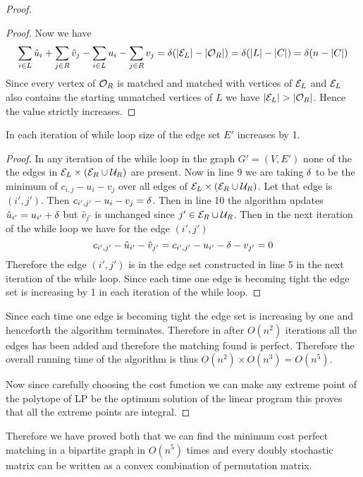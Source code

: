 \documentclass[twoside]{article}
\begin{document}
\begin{proof}
\begin{claimwidth}
\begin{proof}
			Now we have $$
			\sum\limits_{i\in L}\hat{u}_i+\sum\limits_{j\in R}\hat{v}_j-\sum\limits_{i\in L}u_i-\sum\limits_{j\in R}v_j=\delta(|\mathcal{E}_L|-|\mathcal{O}_R|)=\delta(|L|-|C|)=\delta(n-|C|)$$
			Since every vertex of $\mathcal{O}_R$ is matched and matched with vertices of $\mathcal{E}_L$ and $\mathcal{E}_L$ also contains the starting unmatched vertices of $L$ we have $|\mcE_L|>|\mcO_R|$. Hence the value strictly increases.
		\end{proof}
		\begin{claim}{}{}
			In each iteration of while loop size of the edge set $E'$ increases by 1.
		\end{claim}
		\begin{proof}
			In any iteration of the while loop in the graph $G'=(V,E')$ none of the the edges in $\mathcal{E}_L\times (\mathcal{E}_R\cup \mathcal{U}_R)$ are present. Now in line 9 we are taking $\delta$ to be the minimum of $c_{i,j}-u_i-v_j$ over all edges of $\mathcal{E}_L\times (\mathcal{E}_R\cup \mathcal{U}_R)$. Let that edge is $(i',j')$. Then $c_{i',j'}-u_i-v_j=\delta$. Then in line 10 the algorithm updates $\hat{u}_{i'}=u_{i'}+\delta$ but $\hat{v}_{j'}$ is unchanged since $j'\in \mathcal{E}_R\cup\mathcal{U}_R$. Then in the next iteration of the while loop we have for the edge $(i',j')$ $$c_{i',j'}-\hat{u}_{i'}-\hat{v}_{j'}=c_{i',j'}-u_{i'}-\delta-v_{j'}=0$$Therefore the edge $(i',j')$ is in the edge set constructed in line 5 in the next iteration of the while loop. Since each time one edge is becoming tight the edge set is increasing by 1 in each iteration of the while loop.
		\end{proof}
	\end{claimwidth}
	Since each time one edge is becoming tight the edge set is increasing by one and henceforth the algorithm terminates. Therefore in after $O(n^2)$  iterations all the edges has been added and therefore the  matching found is perfect. Therefore the overall running time of the algorithm is thus $O(n^2)\times O(n^3)=O(n^5)$.
	
	Now since carefully choosing the cost function we can make any extreme point of the polytope of LP be the optimum solution of the linear program this proves that all the extreme points are integral.
\end{proof}

Therefore we have proved both that we can find the minimum cost perfect matching in a bipartite graph in $O(n^5)$ times and every doubly stochastic matrix can be written as a convex combination of permutation matrix.
\end{document}

